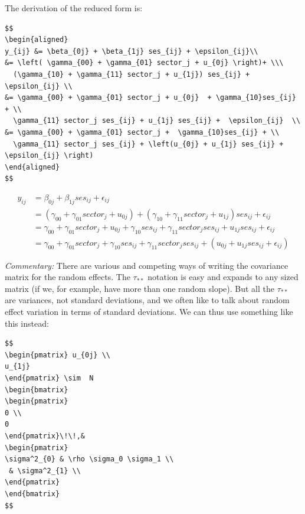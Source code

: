 \documentclass[
  letterpaper,
  DIV=11,
  numbers=noendperiod]{scrreprt}
\begin{document}
The derivation of the reduced form is:

\begin{verbatim}
$$
\begin{aligned}
y_{ij} &= \beta_{0j} + \beta_{1j} ses_{ij} + \epsilon_{ij}\\
&= \left( \gamma_{00} + \gamma_{01} sector_j + u_{0j} \right)+ \\\
  (\gamma_{10} + \gamma_{11} sector_j + u_{1j}) ses_{ij} +  \epsilon_{ij} \\
&= \gamma_{00} + \gamma_{01} sector_j + u_{0j}  + \gamma_{10}ses_{ij} + \\
  \gamma_{11} sector_j ses_{ij} + u_{1j} ses_{ij} +  \epsilon_{ij}  \\
&= \gamma_{00} + \gamma_{01} sector_j +  \gamma_{10}ses_{ij} + \\
  \gamma_{11} sector_j ses_{ij} + \left(u_{0j} + u_{1j} ses_{ij} + \epsilon_{ij} \right) 
\end{aligned}
$$
\end{verbatim}

\[
\begin{aligned}
y_{ij} &= \beta_{0j} + \beta_{1j} ses_{ij} + \epsilon_{ij}\\
&= \left( \gamma_{00} + \gamma_{01} sector_j + u_{0j} \right)+ (\gamma_{10} + \gamma_{11} sector_j + u_{1j}) ses_{ij} +  \epsilon_{ij} \\
&= \gamma_{00} + \gamma_{01} sector_j + u_{0j}  + \gamma_{10}ses_{ij} + \gamma_{11} sector_j ses_{ij} + u_{1j} ses_{ij} +  \epsilon_{ij}  \\
&= \gamma_{00} + \gamma_{01} sector_j +  \gamma_{10}ses_{ij} + \gamma_{11} sector_j ses_{ij} + \left(u_{0j} + u_{1j} ses_{ij} + \epsilon_{ij} \right) 
\end{aligned}
\]

\emph{Commentary:} There are various and competing ways of writing the
covariance matrix for the random effects. The \(\tau_{**}\) notation is
easy and expands to any sized matrix (if we, for example, have more than
one random slope). But all the \(\tau_{**}\) are variances, not standard
deviations, and we often like to talk about random effect variation in
terms of standard deviations. We can thus use something like this
instead:

\begin{verbatim}
$$
\begin{pmatrix} u_{0j} \\
u_{1j}
\end{pmatrix} \sim  N
\begin{bmatrix}
\begin{pmatrix}
0 \\
0
\end{pmatrix}\!\!,&
\begin{pmatrix}
\sigma^2_{0} & \rho \sigma_0 \sigma_1 \\
 & \sigma^2_{1} \\
\end{pmatrix}
\end{bmatrix}
$$
\end{verbatim}
\end{document}
